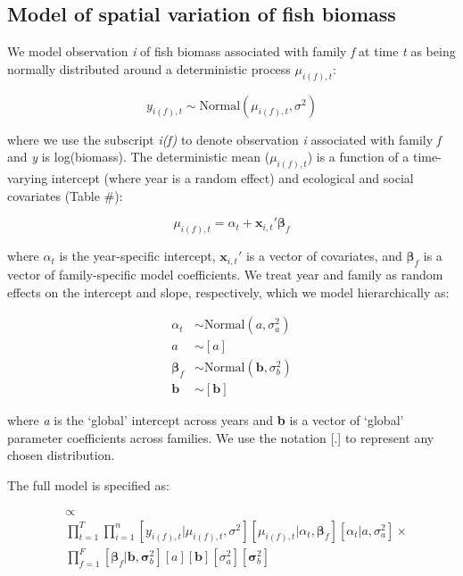 \documentclass[12pt,]{article}
\title{}
\author{}
\date{}
\begin{document}
\maketitle


\subsection{Model of spatial variation of fish
biomass}\label{model-of-spatial-variation-of-fish-biomass}

We model observation \emph{i} of fish biomass associated with family
\emph{f} at time \emph{t} as being normally distributed around a
deterministic process \(\mu_{i(f),t}\):

\begin{equation}
y_{i(f),t} \sim \text{Normal}(\mu_{i(f),t}, \sigma^2)
\end{equation}

where we use the subscript \emph{i(f)} to denote observation \emph{i}
associated with family \emph{f} and \emph{y} is log(biomass). The
deterministic mean (\(\mu_{i(f),t}\)) is a function of a time-varying
intercept (where year is a random effect) and ecological and social
covariates (Table \#):

\begin{equation}
\mu_{i(f),t} = \alpha_t + \textbf{x}_{i,t}' \boldsymbol{\beta}_f 
\end{equation}

where \(\alpha_t\) is the year-specific intercept, \(\textbf{x}_{i,t}'\)
is a vector of covariates, and \(\boldsymbol{\beta}_f\) is a vector of
family-specific model coefficients. We treat year and family as random
effects on the intercept and slope, respectively, which we model
hierarchically as:

\begin{align}
\alpha_t &\sim \text{Normal}(a, \sigma^2_a) \\
a &\sim [a] \\
\boldsymbol{\beta}_f &\sim \text{Normal}(\textbf{b}, \sigma^2_b) \\
\textbf{b} &\sim [\textbf{b}]
\end{align}

where \emph{a} is the `global' intercept across years and \textbf{b} is
a vector of `global' parameter coefficients across families. We use the
notation {[}.{]} to represent any chosen distribution.

The full model is specified as:

\begin{align}
[\sigma^2, \boldsymbol{\alpha}, \textbf{B}, a, \textbf{b}, \sigma^2_a, \boldsymbol{\sigma}^2_b] &\propto \\ \nonumber 
&\prod_{t=1}^T \prod_{i=1}^n [y_{i(f),t} | \mu_{i(f),t}, \sigma^2] [\mu_{i(f),t} | \alpha_t, \boldsymbol{\beta}_f] [\alpha_t | a, \sigma^2_a] \times \\ \nonumber 
&\prod_{f=1}^F [\boldsymbol{\beta}_f | \textbf{b}, \boldsymbol{\sigma}^2_b] [a] [\textbf{b}] [\sigma^2_a] [\boldsymbol{\sigma}^2_b]
\end{align}
\end{document}
